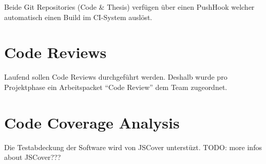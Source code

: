Beide Git Repositories (Code \& Thesis) verfügen über einen \gls{PushHook} welcher automatisch einen Build im CI-System auslöst.


\section{Code Reviews}
Laufend sollen Code Reviews durchgeführt werden. Deshalb wurde pro Projektphase ein Arbeitspacket ``Code Review'' dem Team zugeordnet.


\section{Code Coverage Analysis}
Die Testabdeckung der Software wird von JSCover \cite{JSCover} unterstüzt.
\newline TODO: more infos about JSCover???
